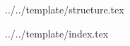 


\def\DOCUMENTO{}
\def\VERSIONE{}

\def\DESCRIZIONE{}

\def\REDATTORE {}
\def\VERIFICATORE {}
\def\RESPONSABILE {}

\def\USO {}

\def\DISTRIBUZIONE {\GRUPPO{}\\ & \COMMITTENTE{}\\}


\def\INDICE	{false}
\def\TABELLE {false}
\def\FIGURE {false}


 {../../template/structure.tex}


 {../../template/index.tex}








